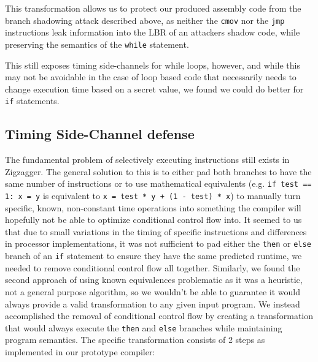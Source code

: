 \documentclass[sigplan, review]{acmart}
\begin{document}
This transformation allows us to protect our produced assembly code from the branch shadowing attack described above, as neither the \texttt{cmov} nor the \texttt{jmp} instructions leak information into the LBR of an attackers shadow code, while preserving the semantics of the \texttt{while} statement.

This still exposes timing side-channels for while loops, however, and while this may not be avoidable in the case of loop based code that necessarily needs to change execution time based on a secret value, we found we could do better for \texttt{if} statements.

\subsection{Timing Side-Channel defense}
The fundamental problem of selectively executing instructions still exists in Zigzagger. The general solution to this is to either pad both branches to have the same number of instructions or to use mathematical equivalents (e.g. \texttt{if test == 1: x = y} is equivalent to \texttt{x = test * y + (1 - test) * x}) to manually turn specific, known, non-constant time operations into something the compiler will hopefully not be able to optimize conditional control flow into. It seemed to us that due to small variations in the timing of specific instructions and differences in processor implementations, it was not sufficient to pad either the \texttt{then} or \texttt{else} branch of an \texttt{if} statement to ensure they have the same predicted runtime, we needed to remove conditional control flow all together. Similarly, we found the second approach of using known equivalences problematic as it was a heuristic, not a general purpose algorithm, so we wouldn't be able to guarantee it would always provide a valid transformation to any given input program. We instead accomplished the removal of conditional control flow by creating a transformation that would always execute the \texttt{then} and \texttt{else} branches while maintaining program semantics. The specific transformation consists of 2 steps as implemented in our prototype compiler:
\end{document}
